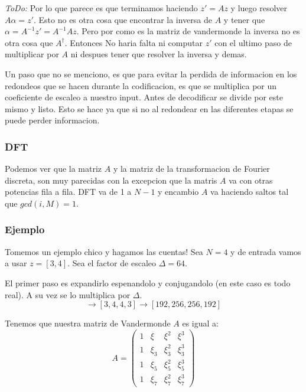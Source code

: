 \documentclass[12pt, oneside]{article}
\begin{document}
\textit{ToDo:} Por lo que parece es que terminamos haciendo $z'=Az$ y luego resolver
$A\alpha=z'$.
Esto no es otra cosa que encontrar la inversa de $A$ y tener que $\alpha=A^{-1}z'=A^{-1}Az$.
Pero por como es la matriz de vandermonde la inversa no es otra cosa que $A^\dagger$.
Entonces No haria falta ni computar $z'$ con el ultimo paso de multiplicar por $A$ ni despues
tener que resolver la inversa y demas.

Un paso que no se menciono, es que para evitar la perdida de informacion en los redondeos
que se hacen durante la codificacion, es que se multiplica por un coeficiente de
escaleo a nuestro input.
Antes de decodificar se divide por este mismo y listo.
Esto se hace ya que si no al redondear en las diferentes etapas se puede perder informacion.

\subsubsection{DFT}
Podemos ver que la matriz $A$  y la matriz de la transformacion de Fourier discreta,
son muy parecidas con la excepcion que la matris $A$ va con otras potencias fila a fila.
DFT va de 1 a $N-1$  y encambio $A$ va haciendo saltos tal que $gcd(i,M)=1$.

\subsubsection{Ejemplo}

Tomemos un ejemplo chico y hagamos las cuentas!
Sea $N=4$ y de entrada vamos a usar $z=[3,4]$.
Sea el factor de escaleo $\Delta=64$.

El primer paso es expandirlo espenandolo y conjugandolo (en este caso es todo real).
A su vez se lo multiplica por  $\Delta$.
\begin{equation*}
    [3,4]\rightarrow [3,4,4,3] \rightarrow [192, 256, 256, 192]
\end{equation*}

Tenemos que nuestra matriz de Vandermonde $A$ es igual a:
\begin{equation*}
    A=
    \begin{pmatrix}
        1 & \xi &  \xi^2 &  \xi^3 \\
        1 & \xi_3 & \xi_3^2 &\xi_3^3\\
        1 & \xi_5 & \xi_5^2 &\xi_5^3\\
        1 & \xi_7 & \xi_7^2 &\xi_7^3
    \end{pmatrix}
    \label{eq:vandermonde_ej}
\end{equation*}
\end{document}

